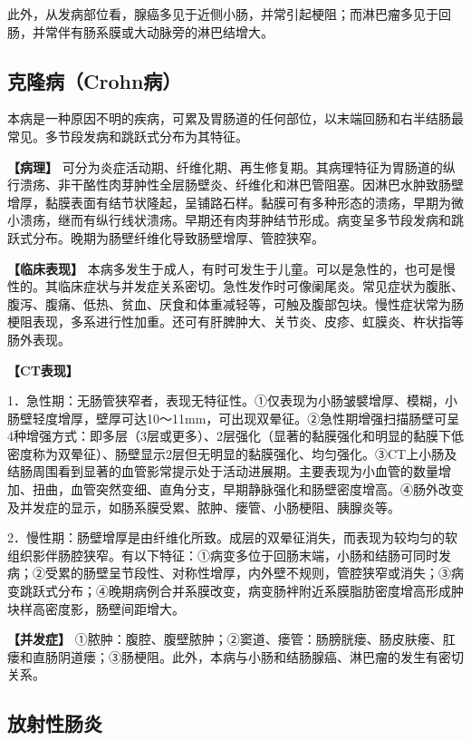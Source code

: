 此外，从发病部位看，腺癌多见于近侧小肠，并常引起梗阻；而淋巴瘤多见于回肠，并常伴有肠系膜或大动脉旁的淋巴结增大。

\subsection{克隆病（Crohn病）}

本病是一种原因不明的疾病，可累及胃肠道的任何部位，以末端回肠和右半结肠最常见。多节段发病和跳跃式分布为其特征。

\textbf{【病理】}
可分为炎症活动期、纤维化期、再生修复期。其病理特征为胃肠道的纵行溃疡、非干酪性肉芽肿性全层肠壁炎、纤维化和淋巴管阻塞。因淋巴水肿致肠壁增厚，黏膜表面有结节状隆起，呈铺路石样。黏膜可有多种形态的溃疡，早期为微小溃疡，继而有纵行线状溃疡。早期还有肉芽肿结节形成。病变呈多节段发病和跳跃式分布。晚期为肠壁纤维化导致肠壁增厚、管腔狭窄。

\textbf{【临床表现】}
本病多发生于成人，有时可发生于儿童。可以是急性的，也可是慢性的。其临床症状与并发症关系密切。急性发作时可像阑尾炎。常见症状为腹胀、腹泻、腹痛、低热、贫血、厌食和体重减轻等，可触及腹部包块。慢性症状常为肠梗阻表现，多系进行性加重。还可有肝脾肿大、关节炎、皮疹、虹膜炎、杵状指等肠外表现。

\textbf{【CT表现】}

1．急性期：无肠管狭窄者，表现无特征性。①仅表现为小肠皱襞增厚、模糊，小肠壁轻度增厚，壁厚可达10～11mm，可出现双晕征。②急性期增强扫描肠壁可呈4种增强方式：即多层（3层或更多）、2层强化（显著的黏膜强化和明显的黏膜下低密度称为双晕征）、肠壁显示2层但无明显的黏膜强化、均匀强化。③CT上小肠及结肠周围看到显著的血管影常提示处于活动进展期。主要表现为小血管的数量增加、扭曲，血管突然变细、直角分支，早期静脉强化和肠壁密度增高。④肠外改变及并发症的显示，如肠系膜受累、脓肿、瘘管、小肠梗阻、胰腺炎等。

2．慢性期：肠壁增厚是由纤维化所致。成层的双晕征消失，而表现为较均匀的软组织影伴肠腔狭窄。有以下特征：①病变多位于回肠末端，小肠和结肠可同时发病；②受累的肠壁呈节段性、对称性增厚，内外壁不规则，管腔狭窄或消失；③病变跳跃式分布；④晚期病例合并系膜改变，病变肠袢附近系膜脂肪密度增高形成肿块样高密度影，肠壁间距增大。

\textbf{【并发症】}
①脓肿：腹腔、腹壁脓肿；②窦道、瘘管：肠膀胱瘘、肠皮肤瘘、肛瘘和直肠阴道瘘；③肠梗阻。此外，本病与小肠和结肠腺癌、淋巴瘤的发生有密切关系。

\subsection{放射性肠炎}

